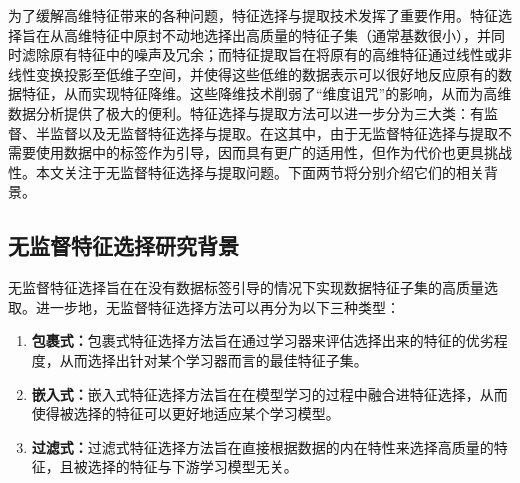 为了缓解高维特征带来的各种问题，特征选择与提取技术发挥了重要作用。特征选择旨在从高维特征中原封不动地选择出高质量的特征子集（通常基数很小），并同时滤除原有特征中的噪声及冗余；而特征提取旨在将原有的高维特征通过线性或非线性变换投影至低维子空间，并使得这些低维的数据表示可以很好地反应原有的数据特征，从而实现特征降维。这些降维技术削弱了“维度诅咒”的影响，从而为高维数据分析提供了极大的便利。特征选择与提取方法可以进一步分为三大类：有监督、半监督以及无监督特征选择与提取。在这其中，由于无监督特征选择与提取不需要使用数据中的标签作为引导，因而具有更广的适用性，但作为代价也更具挑战性。本文关注于无监督特征选择与提取问题。下面两节将分别介绍它们的相关背景。

\subsection{无监督特征选择研究背景}
无监督特征选择旨在在没有数据标签引导的情况下实现数据特征子集的高质量选取。进一步地，无监督特征选择方法可以再分为以下三种类型：
\begin{enumerate}
    \item \textbf{包裹式：}包裹式特征选择方法旨在通过学习器来评估选择出来的特征的优劣程度，从而选择出针对某个学习器而言的最佳特征子集。
    \item \textbf{嵌入式：}嵌入式特征选择方法旨在在模型学习的过程中融合进特征选择，从而使得被选择的特征可以更好地适应某个学习模型。
    \item \textbf{过滤式：}过滤式特征选择方法旨在直接根据数据的内在特性来选择高质量的特征，且被选择的特征与下游学习模型无关。
\end{enumerate}

